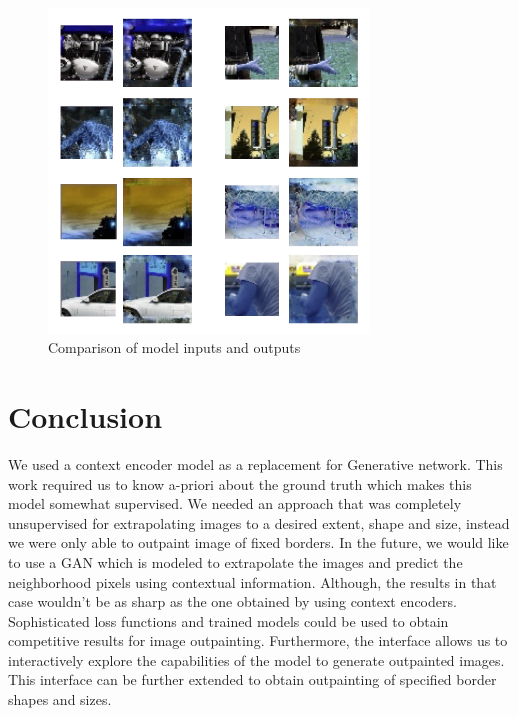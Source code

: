 \documentclass{sig-alternate}
\begin{document}
\begin{figure}[htb]
	\centering
	\includegraphics[width=8.5cm]{testResults}
	\caption{Comparison of model inputs and outputs}
	\label{fig:random}
\end{figure}

\section{Conclusion}
We used a context encoder model as a replacement for Generative network. This work required us to know a-priori about the ground truth which makes this model somewhat supervised. We needed an approach that was completely unsupervised for extrapolating images to a desired extent, shape and size, instead we were only able to outpaint image of fixed borders. In the future, we would like to use a GAN which is modeled to extrapolate the images and predict the neighborhood pixels using contextual information. Although, the results in that case wouldn't be as sharp as the one obtained by using context encoders. Sophisticated loss functions and trained models could be used to obtain competitive results for image outpainting. Furthermore, the interface allows us to interactively explore the capabilities of the model to generate outpainted images. This interface can be further extended to obtain outpainting of specified border shapes and sizes.


%

%
%
\end{document}
